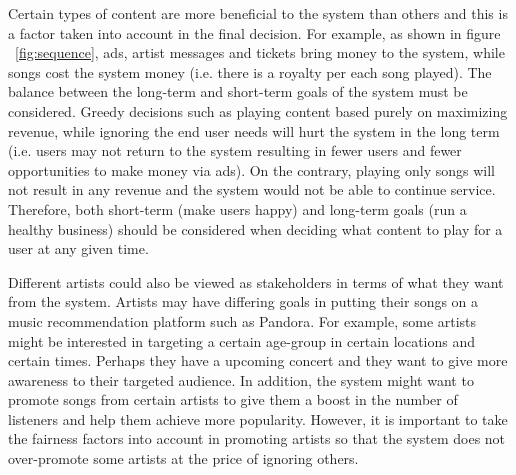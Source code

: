 Certain types of content are more beneficial to the system than others and this is a factor taken into account in the final decision. For example, as shown in  figure ~\ref{fig:sequence}, ads, artist messages and tickets bring money to the system, while songs cost the system money (i.e. there is a royalty per each song played). The balance between the long-term and short-term goals of the system must be considered. Greedy decisions such as playing content based purely on maximizing revenue, while ignoring the end user needs will hurt the system in the long term (i.e. users may not return to the system resulting in fewer users and fewer opportunities to make money via ads). On the contrary, playing only songs will not result in any revenue and the system would not be able to continue service. Therefore, both short-term (make users happy) and long-term goals (run a healthy business) should be considered when deciding what content to play for a user at any given time.

Different artists could also be viewed as stakeholders in terms of what they want from the system. Artists may have differing goals in putting their songs on a music recommendation platform such as Pandora. For example, some artists might be interested in targeting a certain age-group in certain locations and certain times. Perhaps they have a upcoming concert and they want to give more awareness to their targeted audience. In addition, the system might want to promote songs from certain artists to give them a boost in the number of listeners and help them achieve more popularity. However, it is important to take the fairness factors into account in promoting artists so that the system does not over-promote some artists at the price of ignoring others.

